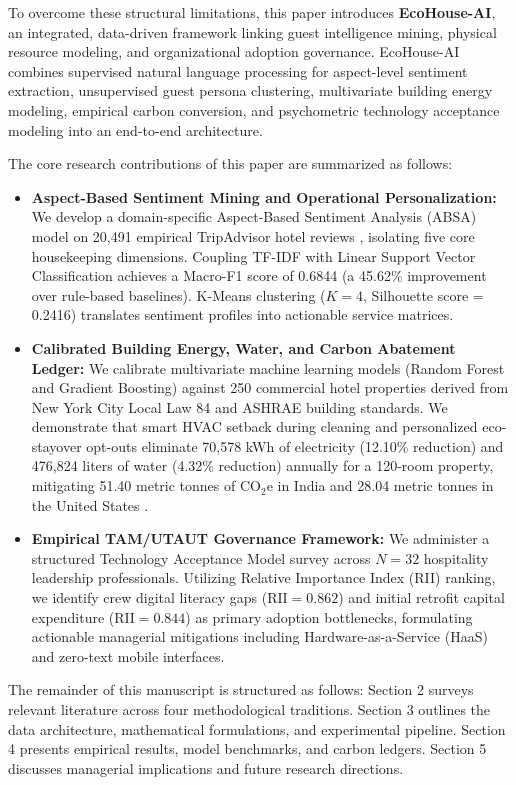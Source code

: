 \documentclass[11pt,a4paper]{article}
\begin{document}
To overcome these structural limitations, this paper introduces \textbf{EcoHouse-AI}, an integrated, data-driven framework linking guest intelligence mining, physical resource modeling, and organizational adoption governance. EcoHouse-AI combines supervised natural language processing for aspect-level sentiment extraction, unsupervised guest persona clustering, multivariate building energy modeling, empirical carbon conversion, and psychometric technology acceptance modeling into an end-to-end architecture.

The core research contributions of this paper are summarized as follows:
\begin{itemize}
    \item \textbf{Aspect-Based Sentiment Mining and Operational Personalization:} We develop a domain-specific Aspect-Based Sentiment Analysis (ABSA) model on 20,491 empirical TripAdvisor hotel reviews \cite{xiang2015}, isolating five core housekeeping dimensions. Coupling TF-IDF with Linear Support Vector Classification achieves a Macro-F1 score of 0.6844 (a 45.62\% improvement over rule-based baselines). K-Means clustering ($K=4$, Silhouette score = 0.2416) translates sentiment profiles into actionable service matrices.
    \item \textbf{Calibrated Building Energy, Water, and Carbon Abatement Ledger:} We calibrate multivariate machine learning models (Random Forest and Gradient Boosting) against 250 commercial hotel properties derived from New York City Local Law 84 \cite{nycll842023} and ASHRAE building standards. We demonstrate that smart HVAC setback during cleaning and personalized eco-stayover opt-outs eliminate 70,578 kWh of electricity (12.10\% reduction) and 476,824 liters of water (4.32\% reduction) annually for a 120-room property, mitigating 51.40 metric tonnes of $\text{CO}_2\text{e}$ in India and 28.04 metric tonnes in the United States \cite{cea2024,epa2024}.
    \item \textbf{Empirical TAM/UTAUT Governance Framework:} We administer a structured Technology Acceptance Model survey across $N=32$ hospitality leadership professionals. Utilizing Relative Importance Index (RII) ranking, we identify crew digital literacy gaps ($\text{RII} = 0.862$) and initial retrofit capital expenditure ($\text{RII} = 0.844$) as primary adoption bottlenecks, formulating actionable managerial mitigations including Hardware-as-a-Service (HaaS) and zero-text mobile interfaces.
\end{itemize}

The remainder of this manuscript is structured as follows: Section 2 surveys relevant literature across four methodological traditions. Section 3 outlines the data architecture, mathematical formulations, and experimental pipeline. Section 4 presents empirical results, model benchmarks, and carbon ledgers. Section 5 discusses managerial implications and future research directions.
\end{document}
